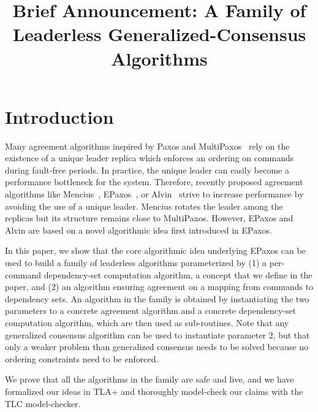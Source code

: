 

\title{Brief Announcement: A Family of Leaderless Generalized-Consensus Algorithms}

\author{}

\date{}



\maketitle

\section{Introduction}

Many agreement algorithms inspired by Paxos and MultiPaxos~\cite{lamport2001paxos} rely on the existence of a unique leader replica which enforces an ordering on commands during fault-free periods.
In practice, the unique leader can easily become a performance bottleneck for the system.
Therefore, recently proposed agreement algorithms like Mencius~\cite{MaoJunqueiraMarzullo08MenciusBuildingEfficientReplicatedStateMachine}, EPaxos~\cite{MoraruAndersenKaminsky13ThereIsMoreConsensusEgalitarianParliaments}, or Alvin~\cite{TurcuETAL14BeGeneralDontGiveUpConsistency} strive to increase performance by avoiding the use of a unique leader.
Mencius rotates the leader among the replicas but its structure remains close to MultiPaxos. 
However, EPaxos and Alvin are based on a novel algorithmic idea first introduced in EPaxos.

In this paper, we show that the core algorithmic idea underlying EPaxos can be used to build a family of leaderless algorithms parameterized by (1) a per-command dependency-set computation algorithm, a concept that we define in the paper, and (2) an algorithm ensuring agreement on a mapping from commands to dependency sets. %
An algorithm in the family is obtained by instantiating the two parameters to a concrete agreement algorithm and a concrete dependency-set computation algorithm, which are then used as sub-routines. 
Note that any generalized consensus algorithm can be used to instantiate parameter 2, but that only a weaker problem than generalized consensus needs to be solved because no ordering constraints need to be enforced.

We prove that all the algorithms in the family are safe and live, and we have formalized our ideas in TLA+ and thoroughly model-check our claims with the TLC model-checker.

